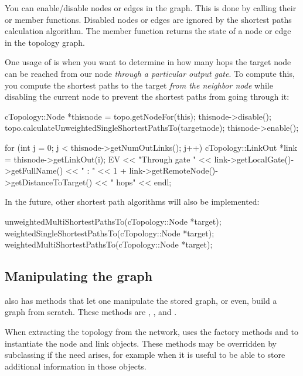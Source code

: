 You can enable/disable nodes or edges in the graph. This is done by
calling their  or  member functions.
Disabled nodes or edges are ignored by the shortest paths calculation
algorithm. The  member function returns the state of
a node or edge in the topology graph.

One usage of  is when you want to determine in how many
hops the target node can be reached from our node \textit{through
a particular output gate}. To compute this, you compute the
shortest paths to the target \textit{from the neighbor node} while
disabling the current node to prevent the shortest paths
from going through it:

\begin{cpp}
cTopology::Node *thisnode = topo.getNodeFor(this);
thisnode->disable();
topo.calculateUnweightedSingleShortestPathsTo(targetnode);
thisnode->enable();

for (int j = 0; j < thisnode->getNumOutLinks(); j++) {
  cTopology::LinkOut *link = thisnode->getLinkOut(i);
  EV << "Through gate " << link->getLocalGate()->getFullName() << " : "
     << 1 + link->getRemoteNode()->getDistanceToTarget() << " hops" << endl;
}
\end{cpp}

In the future, other shortest path algorithms will also be implemented:

\begin{cpp}
unweightedMultiShortestPathsTo(cTopology::Node *target);
weightedSingleShortestPathsTo(cTopology::Node *target);
weightedMultiShortestPathsTo(cTopology::Node *target);
\end{cpp}

\subsection{Manipulating the graph}
\label{sec:sim-lib:ctopology-manipulating}

 also has methods that let one manipulate the stored graph,
or even, build a graph from scratch. These methods are ,
,  and .

When extracting the topology from the network,  uses
the factory methods  and  to instantiate
the node and link objects. These methods may be overridden by subclassing
 if the need arises, for example when it is useful to be
able to store additional information in those objects.



